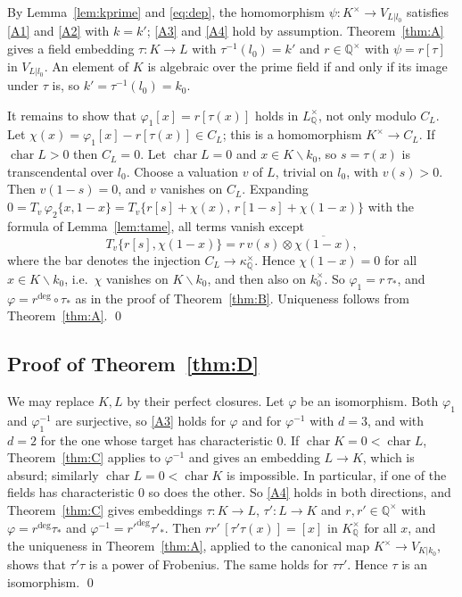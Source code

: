 \documentclass[11pt]{amsart}
\theoremstyle{definition}
\theoremstyle{remark}
\newcommand{\QQ}{\mathbb{Q}}
\newcommand{\chr}{\operatorname{char}}
\newcommand{\sm}{\smallsetminus}
\begin{document}
By Lemma~\ref{lem:kprime} and \eqref{eq:dep}, the homomorphism $\psi\colon K^\times\to V_{L|l_0}$ satisfies \ref{A1} and \ref{A2} with $k=k'$; \ref{A3} and \ref{A4} hold by assumption.
Theorem~\ref{thm:A} gives a field embedding $\tau\colon K\to L$ with $\tau^{-1}(l_0)=k'$ and $r\in\QQ^\times$ with $\psi=r[\tau]$ in $V_{L|l_0}$.
An element of $K$ is algebraic over the prime field if and only if its image under $\tau$ is, so $k'=\tau^{-1}(l_0)=k_0$.

It remains to show that $\varphi_1[x]=r[\tau(x)]$ holds in $L^\times_\QQ$, not only modulo $C_L$. Let $\chi(x)=\varphi_1[x]-r[\tau(x)]\in C_L$; this is a homomorphism $K^\times\to C_L$.
If $\chr L>0$ then $C_L=0$. Let $\chr L=0$ and $x\in K\sm k_0$, so $s=\tau(x)$ is transcendental over $l_0$. Choose a valuation $v$ of $L$, trivial on $l_0$, with $v(s)>0$. Then $v(1-s)=0$, and $v$ vanishes on $C_L$.
Expanding $0=T_v\,\varphi_2\{x,1-x\}=T_v\{r[s]+\chi(x),\,r[1-s]+\chi(1-x)\}$ with the formula of Lemma~\ref{lem:tame}, all terms vanish except
\[ T_v\{r[s],\chi(1-x)\}=r\,v(s)\otimes\overline{\chi(1-x)}, \]
where the bar denotes the injection $C_L\to\kappa^\times_\QQ$. Hence $\chi(1-x)=0$ for all $x\in K\sm k_0$, i.e.\ $\chi$ vanishes on $K\sm k_0$, and then also on $k_0^\times$.
So $\varphi_1=r\,\tau_*$, and $\varphi=r^{\deg}\circ\tau_*$ as in the proof of Theorem~\ref{thm:B}. Uniqueness follows from Theorem~\ref{thm:A}. \qed

\subsection{Proof of Theorem~\ref{thm:D}}
We may replace $K,L$ by their perfect closures. Let $\varphi$ be an isomorphism. Both $\varphi_1$ and $\varphi_1^{-1}$ are surjective, so \ref{A3} holds for $\varphi$ and for $\varphi^{-1}$ with $d=3$, and with $d=2$ for the one whose target has characteristic $0$.
If $\chr K=0<\chr L$, Theorem~\ref{thm:C} applies to $\varphi^{-1}$ and gives an embedding $L\to K$, which is absurd; similarly $\chr L=0<\chr K$ is impossible. In particular, if one of the fields has characteristic $0$ so does the other.
So \ref{A4} holds in both directions, and Theorem~\ref{thm:C} gives embeddings $\tau\colon K\to L$, $\tau'\colon L\to K$ and $r,r'\in\QQ^\times$ with $\varphi=r^{\deg}\tau_*$ and $\varphi^{-1}=r'^{\deg}\tau'_*$.
Then $rr'\,[\tau'\tau(x)]=[x]$ in $K^\times_\QQ$ for all $x$, and the uniqueness in Theorem~\ref{thm:A}, applied to the canonical map $K^\times\to V_{K|k_0}$, shows that $\tau'\tau$ is a power of Frobenius. The same holds for $\tau\tau'$.
Hence $\tau$ is an isomorphism. \qed
\end{document}

